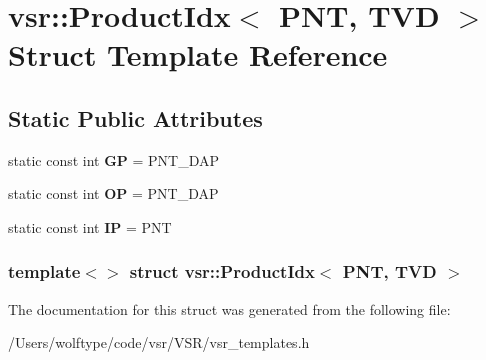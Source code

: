 \hypertarget{structvsr_1_1_product_idx_3_01_p_n_t_00_01_t_v_d_01_4}{\section{vsr\-:\-:Product\-Idx$<$ P\-N\-T, T\-V\-D $>$ Struct Template Reference}
\label{structvsr_1_1_product_idx_3_01_p_n_t_00_01_t_v_d_01_4}
}
\subsection*{Static Public Attributes}
\begin{DoxyCompactItemize}
\item 
\hypertarget{structvsr_1_1_product_idx_3_01_p_n_t_00_01_t_v_d_01_4_ab08251b43867ea58e3be1e872507c81b}{static const int {\bfseries G\-P} = P\-N\-T\-\_\-\-D\-A\-P}\label{structvsr_1_1_product_idx_3_01_p_n_t_00_01_t_v_d_01_4_ab08251b43867ea58e3be1e872507c81b}

\item 
\hypertarget{structvsr_1_1_product_idx_3_01_p_n_t_00_01_t_v_d_01_4_a9c3e8c4a429a50e167b32f10be3c0981}{static const int {\bfseries O\-P} = P\-N\-T\-\_\-\-D\-A\-P}\label{structvsr_1_1_product_idx_3_01_p_n_t_00_01_t_v_d_01_4_a9c3e8c4a429a50e167b32f10be3c0981}

\item 
\hypertarget{structvsr_1_1_product_idx_3_01_p_n_t_00_01_t_v_d_01_4_ab34294c9850205c5a1aeab864e196ed6}{static const int {\bfseries I\-P} = P\-N\-T}\label{structvsr_1_1_product_idx_3_01_p_n_t_00_01_t_v_d_01_4_ab34294c9850205c5a1aeab864e196ed6}

\end{DoxyCompactItemize}
\subsubsection*{template$<$$>$ struct vsr\-::\-Product\-Idx$<$ P\-N\-T, T\-V\-D $>$}



The documentation for this struct was generated from the following file\-:\begin{DoxyCompactItemize}
\item 
/\-Users/wolftype/code/vsr/\-V\-S\-R/vsr\-\_\-templates.\-h\end{DoxyCompactItemize}
